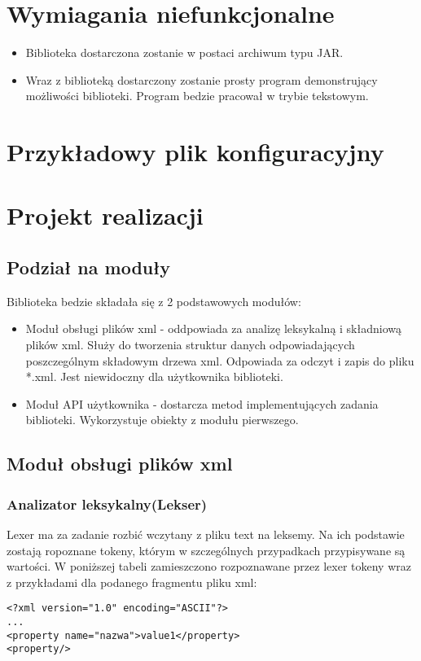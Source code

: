 \documentclass{article}
\begin{document}
\section{Wymiagania niefunkcjonalne}
\begin{itemize}
	\item Biblioteka dostarczona zostanie w postaci archiwum typu JAR.
	\item Wraz z biblioteką dostarczony zostanie prosty program demonstrujący możliwości biblioteki.
	Program bedzie pracował w trybie tekstowym.
\end{itemize}

\section{Przykładowy plik konfiguracyjny}


\newpage
\section{Projekt realizacji}

\subsection{Podział na moduły}
Biblioteka bedzie składała się z 2 podstawowych modułów:
\begin{itemize}
	\item Moduł obsługi plików xml - oddpowiada za analizę leksykalną i składniową plików xml.
	Służy do tworzenia struktur danych odpowiadających poszczególnym składowym drzewa xml.
	Odpowiada za odczyt i zapis do pliku *.xml. Jest niewidoczny dla użytkownika biblioteki.
	\item Moduł API użytkownika - dostarcza metod implementujących zadania biblioteki.
	Wykorzystuje obiekty z modułu pierwszego.
\end{itemize}

\subsection{Moduł obsługi plików xml}


\subsubsection{Analizator leksykalny(Lekser)}
Lexer ma za zadanie rozbić wczytany z pliku text na leksemy.
Na ich podstawie zostają ropoznane tokeny, którym w szczególnych przypadkach przypisywane są wartości.
W poniższej tabeli zamieszczono rozpoznawane przez lexer tokeny wraz z przykładami dla podanego fragmentu pliku xml: 
\begin{verbatim}
<?xml version="1.0" encoding="ASCII"?>
...
<property name="nazwa">value1</property>
<property/>
\end{verbatim} 
\end{document}
